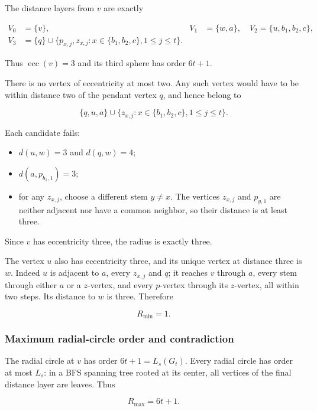 \documentclass[11pt,a4paper]{article}
\theoremstyle{definition}\newtheorem{definition}[theorem]{Definition}
\theoremstyle{remark}\newtheorem{remark}[theorem]{Remark}
\begin{document}
The distance layers from \(v\) are exactly

\[\begin{aligned}
V_0&=\{v\},&V_1&=\{w,a\},\quad V_2=\{u,b_1,b_2,c\},\\
V_3&=\{q\}\cup\{p_{x,j},z_{x,j}:x\in\{b_1,b_2,c\},1\le j\le t\}.
\end{aligned}\]

Thus \(\operatorname{ecc}(v)=3\) and its third sphere has order
\(6t+1\).

There is no vertex of eccentricity at most two. Any such vertex would
have to be within distance two of the pendant vertex \(q\), and hence
belong to

\[\{q,u,a\}\cup\{z_{x,j}:x\in\{b_1,b_2,c\},1\leq j\leq t\}.\]

Each candidate fails:

\begin{itemize}

\item
  \(d(u,w)=3\) and \(d(q,w)=4\);
\item
  \(d(a,p_{b_1,1})=3\);
\item
  for any \(z_{x,j}\), choose a different stem \(y\ne x\). The vertices
  \(z_{x,j}\) and \(p_{y,1}\) are neither adjacent nor have a common
  neighbor, so their distance is at least three.
\end{itemize}

Since \(v\) has eccentricity three, the radius is exactly three.

The vertex \(u\) also has eccentricity three, and its unique vertex at
distance three is \(w\). Indeed \(u\) is adjacent to \(a\), every
\(z_{x,j}\) and \(q\); it reaches \(v\) through \(a\), every stem
through either \(a\) or a \(z\)-vertex, and every \(p\)-vertex through
its \(z\)-vertex, all within two steps. Its distance to \(w\) is three.
Therefore

\[\boxed{R_{\min}=1.}\]

\subsubsection{Maximum radial-circle order and
contradiction}\label{late:154:maximum-radial-circle-order-and-contradiction}

The radial circle at \(v\) has order \(6t+1=L_s(G_t)\). Every radial
circle has order at most \(L_s\): in a BFS spanning tree rooted at its
center, all vertices of the final distance layer are leaves. Thus

\[\boxed{R_{\max}=6t+1.}\]
\end{document}
